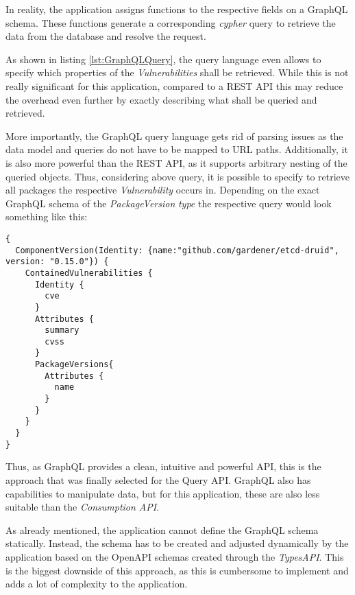 In reality, the application assigns functions to the respective fields on a GraphQL schema. These functions generate a corresponding \emph{cypher} query to retrieve the data from the database and resolve the request.\par
As shown in listing \ref{lst:GraphQLQuery}, the query language even allows to specify which properties of the \emph{Vulnerabilities} shall be retrieved. While this is not really significant for this application, compared to a REST API this may reduce the overhead even further by exactly describing what shall be queried and retrieved.\par 
More importantly, the GraphQL query language gets rid of parsing issues as the data model and queries do not have to be mapped to URL paths. Additionally, it is also more powerful than the REST API, as it supports arbitrary nesting of the queried objects. Thus, considering above query, it is possible to specify to retrieve all packages the respective \emph{Vulnerability} occurs in. Depending on the exact GraphQL schema of the \emph{PackageVersion} \emph{type} the respective query would look something like this:

\begin{lstlisting}[basicstyle=\tiny, caption=Nested GraphQL Query, captionpos=b, label=lst:NestedGraphQLQuery]
{
  ComponentVersion(Identity: {name:"github.com/gardener/etcd-druid", version: "0.15.0"}) {
    ContainedVulnerabilities {
      Identity {
        cve
      }
      Attributes {
        summary
        cvss 
      }
      PackageVersions{
        Attributes {
          name
        }
      }
    }
  }
}
\end{lstlisting}

Thus, as GraphQL provides a clean, intuitive and powerful API, this is the approach that was finally selected for the Query API. GraphQL also has capabilities to manipulate data, but for this application, these are also less suitable than the \emph{Consumption API}.\par
As already mentioned, the application cannot define the GraphQL schema statically. Instead, the schema has to be created and adjusted dynamically by the application based on the OpenAPI schemas created through the \emph{TypesAPI}. This is the biggest downside of this approach, as this is cumbersome to implement and adds a lot of complexity to the application.

